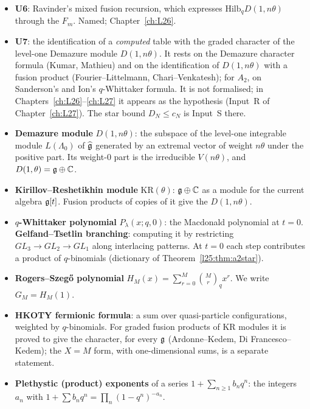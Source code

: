 \begin{itemize}
  $\le(\dim\ltwentyfiveg)^m$, with graded character $F_m$. Its published source for the total dimension is
  Kus--Littelmann, Pacific J.\ Math.\ 278, Theorem~4.2, with one flagged step (p.~437); Feigin's earlier proof has a
  gap (Chapter~\ref{ch:L27}). It is a named hypothesis, reduced in Chapter~\ref{ch:L26}.
\item \textbf{U6}: Ravinder's mixed fusion recursion, which expresses $\mathrm{Hilb}_qD(1,n\theta)$ through the
  $F_m$. Named; Chapter~\ref{ch:L26}.
\item \textbf{U7}: the identification of a \emph{computed} table with the graded character of the level-one Demazure
  module $D(1,n\theta)$. It rests on the Demazure character formula (Kumar, Mathieu) and on the identification of
  $D(1,n\theta)$ with a fusion product (Fourier--Littelmann, Chari--Venkatesh); for $A_2$, on Sanderson's and Ion's
  $q$-Whittaker formula. It is not formalised; in Chapters~\ref{ch:L26}--\ref{ch:L27} it appears as the hypothesis
   (Input~R of Chapter~\ref{ch:L27}). The star bound $D_N\le c_N$ is Input~S there.
\item \textbf{Demazure module} $D(1,n\theta)$: the subspace of the level-one integrable module $L(\Lambda_0)$ of
  $\widehat{\mathfrak g}$ generated by an extremal vector of weight $n\theta$ under the positive part. Its
  weight-$0$ part is the irreducible $V(n\theta)$, and $D(1,\theta)=\mathfrak g\oplus{\mathbb{C}}$.
\item \textbf{Kirillov--Reshetikhin module} $\mathrm{KR}(\theta)$: $\mathfrak g\oplus{\mathbb{C}}$ as a module for the current
  algebra $\mathfrak g[t]$. Fusion products of copies of it give the $D(1,n\theta)$.
\item \textbf{$q$-Whittaker polynomial} $P_\lambda(x;q,0)$: the Macdonald polynomial at $t=0$. \textbf{Gelfand--Tsetlin
  branching}: computing it by restricting $GL_3\to GL_2\to GL_1$ along interlacing patterns. At $t=0$ each step
  contributes a product of $q$-binomials (dictionary of Theorem~\ref{l25:thm:a2star}).
\item \textbf{Rogers--Szeg\H{o} polynomial} $H_M(x)=\sum_{r=0}^M\binom Mr_qx^r$. We write $G_M=H_M(1)$.
\item \textbf{HKOTY fermionic formula}: a sum over quasi-particle configurations, weighted by $q$-binomials. For
  graded fusion products of KR modules it is proved to give the character, for every $\mathfrak g$ (Ardonne--Kedem,
  Di Francesco--Kedem); the $X=M$ form, with one-dimensional sums, is a separate statement.
\item \textbf{Plethystic (product) exponents} of a series $1+\sum_{n\ge1}b_nq^n$: the integers $a_n$ with
  $1+\sum b_nq^n=\prod_n(1-q^n)^{-a_n}$.
\end{itemize}


